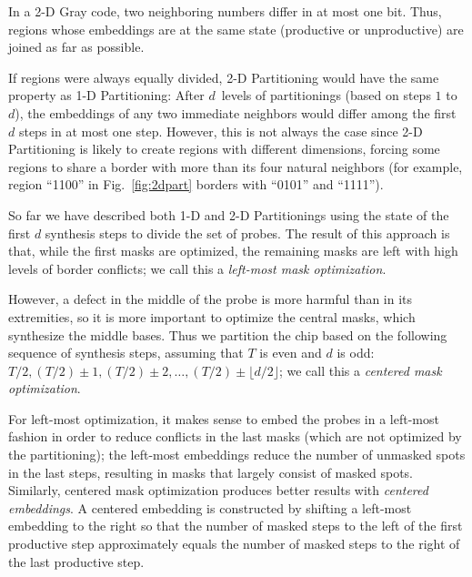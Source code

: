 \documentclass{w-edbk}
\begin{document}
In a 2-D Gray code, two neighboring numbers differ in at most one
bit.  Thus, regions whose embeddings are at the same state (productive or
unproductive) are joined as far as possible.

If regions were always equally divided, 2-D Partitioning would have
the same property as 1-D Partitioning: After $d$~levels of
partitionings (based on steps $1$ to $d$), the embeddings of any two
immediate neighbors would differ among the first $d$ steps in at most
one step. However, this is not always the case since 2-D Partitioning
is likely to create regions with different dimensions, forcing some
regions to share a border with more than its four natural neighbors
(for example, region ``1100'' in Fig.~\ref{fig:2dpart} borders with
``0101'' and ``1111'').

So far we have described both 1-D and 2-D Partitionings using the
state of the first $d$ synthesis steps to divide the set of probes.
The result of this approach is that, while the first masks are
optimized, the remaining masks are left with high levels of border
conflicts; we call this a \emph{left-most mask optimization}.

However, a defect in the middle of the probe is more harmful than in
its extremities, so it is more important to optimize the central masks,
which synthesize the middle bases. Thus we
partition the chip based on the following sequence
of synthesis steps, assuming that $T$ is even and $d$ is odd: $T/2,
(T/2)\pm 1, (T/2)\pm 2, \dots, (T/2)\pm\lfloor d/2\rfloor$; we call
this a \emph{centered mask optimization}.

For left-most optimization, it makes sense to embed the probes in a
left-most fashion in order to reduce conflicts in the last masks
(which are not optimized by the partitioning); the left-most
embeddings reduce the number of unmasked spots in the last steps,
resulting in masks that largely consist of masked spots. Similarly,
centered mask optimization produces better results with \emph{centered
  embeddings}. A centered embedding is constructed by shifting a
left-most embedding to the right so that the number of masked steps to
the left of the first productive step approximately equals the number
of masked steps to the right of the last productive step.
\end{document}
